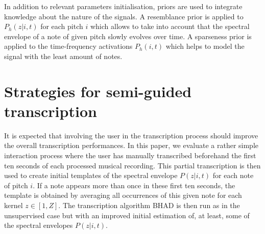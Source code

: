 \documentclass{article}
\begin{document}
In addition to relevant parameters initialisation, priors are used to integrate knowledge about the nature of the signals. A resemblance prior \cite{Fuentes2013_PhD} is applied to $P_h(z|i,t)$ for each pitch $i$ which allows to take into account that the spectral envelope of a note of given pitch slowly evolves over time. A sparseness prior is applied to the time-frequency activations $P_h(i,t)$ which helps to model the signal with the least amount of notes.


\vspace{0.3cm}


\section{Strategies for semi-guided transcription}
\label{sec:semiguided}


It is expected that involving the user in the transcription process should improve the overall transcription performances. In this paper, we evaluate a rather simple interaction process where the user has manually transcribed beforehand the first ten seconds of each processed musical recording. This partial transcription is then used to create initial templates of the spectral envelope $P(z|i,t)$ for each note of pitch $i$. If a note appears more than once in these first ten seconds, the template is obtained by averaging all occurrences of this given note for each kernel $z \in \left[1,Z\right]$. The transcription algorithm BHAD is then run as in the unsupervised case but with an improved initial estimation of, at least, some of the spectral envelopes $P(z|i,t)$.
\end{document}
